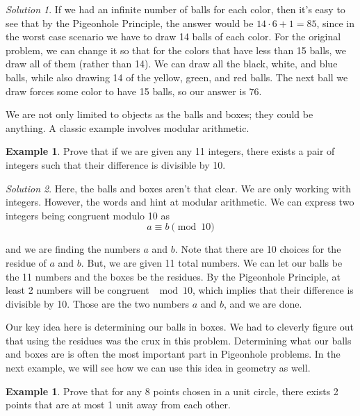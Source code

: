 \documentclass[l1pt]{article}
\theoremstyle{plain}
\theoremstyle{definition}
\newtheorem{example}[thm]{Example}
\theoremstyle{remark}
\newtheorem*{solution}{Solution}
\begin{document}
\begin{solution}
If we had an infinite number of balls for each color, then it's easy to see that by the Pigeonhole Principle, the answer would be $14\cdot 6+1=85$, since in the worst case scenario we have to draw 14 balls of each color. For the original problem, we can change it so that for the colors that have less than 15 balls, we draw all of them (rather than 14). We can draw all the black, white, and blue balls, while also drawing 14 of the yellow, green, and red balls. The next ball we draw forces some color to have 15 balls, so our answer is $\boxed{76}$.
\end{solution}

\bigskip

We are not only limited to objects as the balls and boxes; they could be anything. A classic example involves modular arithmetic.

\begin{example}
\label{example:easymod}
Prove that if we are given any 11 integers, there exists a pair of integers such that their difference is divisible by 10.
\end{example}

\begin{solution}
Here, the balls and boxes aren't that clear. We are only working with integers. However, the words  and  hint at modular arithmetic. We can express two integers being congruent modulo 10 as \[a \equiv b \pmod {10}\]

and we are finding the numbers $a$ and $b$. Note that there are 10 choices for the residue of $a$ and $b$. But, we are given 11 total numbers. We can let our balls be the 11 numbers and the boxes be the residues. By the Pigeonhole Principle, at least 2 numbers will be congruent $\mod 10$, which implies that their difference is divisible by 10. Those are the two numbers $a$ and $b$, and we are done.
\end{solution}

\bigskip

Our key idea here is determining our balls in boxes. We had to cleverly figure out that using the residues was the crux in this problem. Determining what our balls and boxes are is often the most important part in Pigeonhole problems. In the next example, we will see how we can use this idea in geometry as well.

\begin{example}
Prove that for any 8 points chosen in a unit circle, there exists 2 points that are at most 1 unit away from each other.
\end{example}
\end{document}
